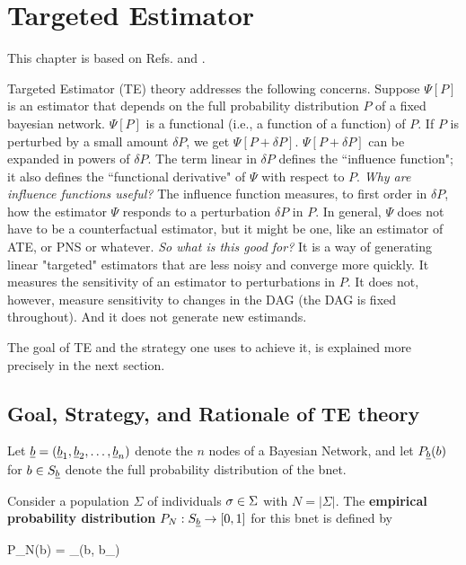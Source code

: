 \chapter{Targeted Estimator}
\label{ch-targeted-est}

\newcommand{\dpsi}[0]{\nabla\Psi}
\newcommand{\hatl}[0]{\HAT{\call}}

This chapter is based on Refs.\cite{tlride} and  \cite{hoff}.

Targeted Estimator (TE) theory  addresses
the following concerns.
Suppose $\Psi[P]$ is an estimator that depends on the full probability distribution $P$ of a fixed bayesian network.
$\Psi[P]$ is a functional (i.e., a function of a function) of $P$. If $P$ is perturbed by a small amount $\delta P$, we get $\Psi[P+\delta P]$. $\Psi[P + \delta P]$ can be expanded in powers of $\delta P$.
The term linear  in $\delta P$ defines the ``influence function"; it also defines the ``functional derivative"  of $\Psi$ with respect to $P$. {\it Why are influence functions useful?}
 The influence function measures,
 to first order in $\delta P$, how the estimator $\Psi$ responds to a perturbation 
 $\delta P$ in $P$. In general, $\Psi$ does not have to be a counterfactual estimator, but it might be one, like an estimator of ATE, or PNS or whatever.
{\it So what is this good for?} It is a way of generating linear "targeted" estimators
that are less noisy
and converge more quickly. It measures the sensitivity of an estimator to perturbations in $P$. It does not, however, measure sensitivity to changes in the DAG (the DAG is fixed throughout). And it does not generate new estimands.

The goal of TE and
the strategy one uses to achieve it, is
explained more precisely in the next section.




\section{Goal, Strategy, and Rationale of TE theory}


Let ${\underline{b}} = ({\underline{b}}_1, {\underline{b}}_2, \ldots, {\underline{b}}_{n})$ denote
the $n$ nodes of a Bayesian Network, and let $P_{\underline{b}}(b)$ for $b\in S_{\underline{b}}$
denote the full probability distribution of the bnet.

 Consider a population $\Sigma$ of
 individuals $\sigma\in \Sigma$ with $N=|\Sigma|$.
 The {\bf empirical probability distribution}
 $P_N:S_{\underline{b}} \rightarrow [0,1]$ for this bnet is defined by

\beq
P_N(b) = \sum_\s\delta(b, b_\s)
\eeq

